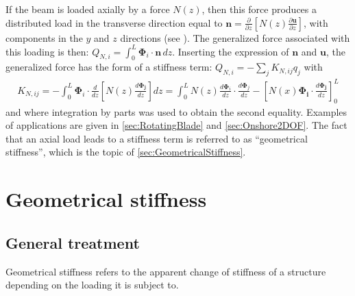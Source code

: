 \documentclass[wes, manuscript]{copernicus}
\renewcommand{\v}[1]{\boldsymbol{#1}}
\newcommand{\todoBoth}    [1]{{\colorbox{yellow}{TODO Both:    }}{\color{red}{#1}}\colorbox{yellow}{/}}
\begin{document}
If the beam is loaded axially by a force $N(z)$, then this force produces a distributed load in the transverse direction equal to $\v{n} = \frac{\partial}{\partial z}\left[N(z)\frac{\partial \v{u}}{\partial z}\right]$, with components in the $y$ and $z$ directions (see \cite{branlard:2019flex}).
The generalized force associated with this loading is then: $Q_{N,i}=\int_0^L \v{\Phi}_i\cdot \v{n}\, dz$.
Inserting the expression of $\v{n}$ and $\v{u}$, the generalized force has the form of a stiffness term: $Q_{N,i} =-\sum_j K_{N,ij} q_j$ with
\begin{align}
   K_{N,ij} = -\int_0^L \v{\Phi}_i \cdot \frac{d}{d z} \left[N(z) \frac{d \v{\Phi_j}}{d z}\right] dz  
       = \int_0^L N(z) \frac{d \v{\Phi}_i }{dz}\cdot \frac{d \v{\Phi}_j }{dz} - \left[N(x) \v{\Phi_i}\cdot \frac{d\v{\Phi_j}}{dz}\right]_0^L
   \label{eq:StiffnessAxial}
\end{align}
and where integration by parts was used to obtain the second equality.
Examples of applications are given in \autoref{sec:RotatingBlade} and \autoref{sec:Onshore2DOF}.
The fact that an axial load leads to a stiffness term is referred to as ``geometrical stiffness'', which is the topic of \autoref{sec:GeometricalStiffness}.





\section{Geometrical stiffness}
\label{sec:GeometricalStiffness}
\subsection{General treatment}
Geometrical stiffness refers to the apparent change of stiffness of a structure depending on the loading it is subject to.
\end{document}
